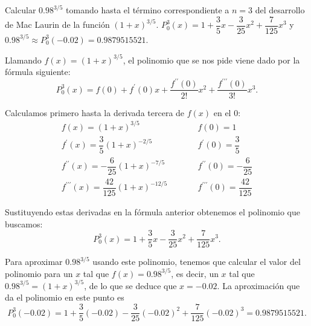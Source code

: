{Calcular $0.98^{3/5}$ tomando hasta el término correspondiente a $n=3$ del desarrollo de Mac Laurin de la función $(1+x)^{3/5}$.
}
{$P_{0}^{3}(x)=1+\dfrac{3}{5}x-\dfrac{3}{25}x^{2}+\dfrac{7}{125}x^{3}$ y $0.98^{3/5}\approx P_{0}^{3}(-0.02)= 0.9879515521$.
}
{Llamando $f(x)=(1+x)^{3/5}$, el polinomio que se nos pide viene dado por la fórmula siguiente: 
\[
P_{0}^{3}(x)=f(0)+f^{\prime }(0)x+\frac{f^{\prime \prime }(0)}{2!}x^{2}+\frac{f^{\prime \prime \prime }(0)}{3!}x^{3}.
\]

Calculamos primero hasta la derivada tercera de $f(x)$ en el $0$:
\[
\renewcommand{\arraystretch}{2}
\begin{array}{lll}
f(x)=(1+x) ^{3/5} & \qquad & f(0)=1 \\
f^{\prime}(x)=\dfrac{3}{5}(1+x)^{-2/5} & & f^{\prime }(0)=\dfrac{3}{5}\\
f^{\prime \prime}(x)=-\dfrac{6}{25}(1+x)^{-7/5} & & f^{\prime \prime }(0)=-\dfrac{6}{25}\\
f^{\prime \prime \prime}(x)=\dfrac{42}{125}(1+x)^{-12/5} & & f^{\prime \prime \prime }(0)=\dfrac{42}{125}
\end{array}
\]

Sustituyendo estas derivadas en la fórmula anterior obtenemos el polinomio que buscamos: 
\[
P_{0}^{3}(x)=1+\dfrac{3}{5}x-\dfrac{3}{25}x^{2}+\frac{7}{125}x^{3}.
\]

Para aproximar $0.98^{3/5}$ usando este polinomio, tenemos que calcular el valor del polinomio para un $x$ tal que $f(x)=0.98^{3/5}$, es decir, un $x$ tal que $0.98^{3/5}=(1+x)^{3/5}$, de lo que se deduce que $x=-0.02$. La aproximación que da el polinomio en este punto es 
\[
P_{0}^{3}(-0.02)=1+\dfrac{3}{5}(-0.02)-\dfrac{3}{25}(-0.02)^{2}+\frac{7}{125}(-0.02)^{3}=0.9879515521.
\]
}


